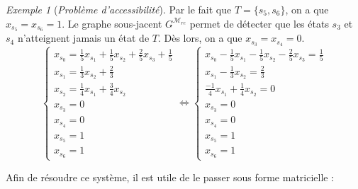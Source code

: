 \documentclass[12pt,a4paper]{report}
\theoremstyle{definition}%
\theoremstyle{remark}
\newtheorem{example}{Exemple}[chapter]
\begin{document}
\begin{example}[\textit{Problème d'accessibilité}]
Par le fait que $T = \{s_5, s_6\}$, on a que $x_{s_5} = x_{s_6} = 1$. Le graphe sous-jacent $G^{\mathcal{M}_{re}}$ permet de détecter que %
les états $s_3$ et $s_4$ n'atteignent jamais un état de $T$. Dès lors, on a que $x_{s_3} = x_{s_4} = 0$.
\[
	\begin{cases}
		x_{s_0} = \frac{1}{5} x_{s_1} + \frac{1}{5} x_{s_2} + \frac{2}{5} x_{s_3} + \frac{1}{5} \\
		x_{s_1} = \frac{1}{3} x_{s_2} + \frac{2}{3} \\
		x_{s_2} = \frac{1}{4} x_{s_1} + \frac{3}{4} x_{s_2} \\
		x_{s_3} = 0 \\
		x_{s_4} = 0 \\
		x_{s_5} = 1 \\
		x_{s_6} = 1
	\end{cases}
	\iff
	\begin{cases}
	x_{s_0} - \frac{1}{5} x_{s_1} - \frac{1}{5} x_{s_2} - \frac{2}{5} x_{s_3} = \frac{1}{5} \\
	x_{s_1} - \frac{1}{3} x_{s_2} = \frac{2}{3} \\
	\frac{-1}{4} x_{s_1} + \frac{1}{4} x_{s_2} = 0 \\
	x_{s_3} = 0 \\
	x_{s_4} = 0 \\
	x_{s_5} = 1 \\
	x_{s_6} = 1 
	\end{cases}
\]

Afin de résoudre ce système, il est utile de le passer sous forme matricielle :


\end{example}
\end{document}
